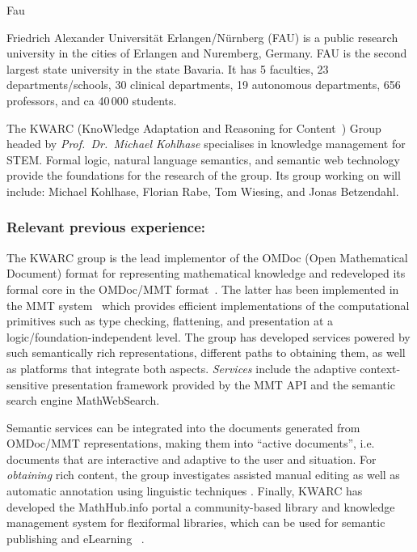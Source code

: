 \begin{sitedescription}{Fau}

  
  Friedrich Alexander Universit\"at Erlangen/N\"urnberg (FAU) is a public research
  university in the cities of Erlangen and Nuremberg, Germany. FAU is the second largest
  state university in the state Bavaria. It has 5 faculties, 23 departments/schools, 30
  clinical departments, 19 autonomous departments, 656 professors, and ca 40\,000
  students.

  The KWARC (KnoWledge Adaptation and Reasoning for Content~\cite{KWARC:on}) Group
  headed by {\emph{Prof.\ Dr.\ Michael Kohlhase}} specialises in knowledge management for
  STEM.  Formal logic, natural language semantics, and semantic web technology provide the
  foundations for the research of the group. Its group working on \pn will include: Michael
  Kohlhase, Florian Rabe, Tom Wiesing, and Jonas Betzendahl.

% 
% 
% 

\subsubsection*{Relevant previous experience:}

The KWARC group is the lead implementor of the OMDoc (Open Mathematical Document) format
for representing mathematical knowledge \cite{Kohlhase:OMDoc1.2} and redeveloped its
formal core in the OMDoc/MMT format~\cite{RabKoh:WSMSML13}. The latter has been
implemented in the MMT system~\cite{MMTSVN:on,RabKoh:WSMSML13} which provides efficient
implementations of the computational primitives such as type checking, flattening, and
presentation at a logic/foundation-independent level.  The group has developed services
powered by such semantically rich representations, different paths to obtaining them, as
well as platforms that integrate both aspects.  \emph{Services} include the adaptive
context-sensitive presentation framework provided by the MMT API and the semantic search
engine MathWebSearch\cite{KohSuc:asemf06,ProKoh:mwssofse12}. 

Semantic services can be integrated into the documents generated from OMDoc/MMT
representations, making them into ``active documents'', i.e. documents that are
interactive and adaptive to the user and situation.  For \emph{obtaining} rich content,
the group investigates assisted manual editing \cite{JucKoh:sidesc10:biblatex} as well as
automatic annotation using linguistic techniques \cite{GinJucAnc:alsaacl09}.  Finally,
KWARC has developed the \textsf{MathHub.info} portal a community-based library and
knowledge management system for flexiformal libraries, which can be used for semantic
publishing and eLearning~ \cite{KohDavGin:psewads11,MathHub:on,IanJucKoh:sdm14}.


\end{sitedescription}
